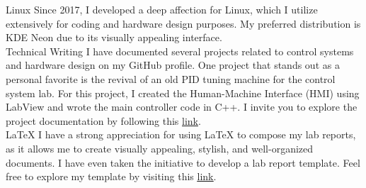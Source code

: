 
\newpage
{}

\begin{cvskills}

  \cvskill
    {Linux} %
    {Since 2017, I developed a deep affection for Linux, which I utilize extensively for coding and hardware design purposes. My preferred distribution is KDE Neon due to its visually appealing interface.}\\ %
  \cvskill
    {Technical Writing} %
    {I have documented several projects related to control systems and hardware design on my GitHub profile. One project that stands out as a personal favorite is the revival of an old PID tuning machine for the control system lab. For this project, I created the Human-Machine Interface (HMI) using LabView and wrote the main controller code in C++. I invite you to explore the project documentation by following this \href{https://github.com/justraven/Feedback-Educational-Servo-ES151-Remake}{\underline{link}}.}\\ %
  \cvskill
    {LaTeX} %
    {I have a strong appreciation for using LaTeX to compose my lab reports, as it allows me to create visually appealing, stylish, and well-organized documents. I have even taken the initiative to develop a lab report template. Feel free to explore my template by visiting this \href{https://github.com/justraven/template-laporan-praktikum-LaTEX}{\underline{link}}.} %

\end{cvskills}